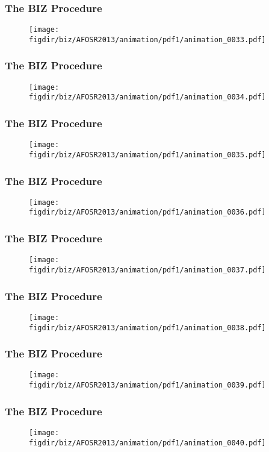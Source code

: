 \documentclass[13pt]{beamer}
\newcommand{\figdir}{../../fig}
\begin{document}
\begin{frame}\frametitle{The BIZ Procedure}\begin{figure}\texttt{[image: \\figdir/biz/AFOSR2013/animation/pdf1/animation\_0033.pdf]}\end{figure}\end{frame}
\begin{frame}\frametitle{The BIZ Procedure}\begin{figure}\texttt{[image: \\figdir/biz/AFOSR2013/animation/pdf1/animation\_0034.pdf]}\end{figure}\end{frame}
\begin{frame}\frametitle{The BIZ Procedure}\begin{figure}\texttt{[image: \\figdir/biz/AFOSR2013/animation/pdf1/animation\_0035.pdf]}\end{figure}\end{frame}
\begin{frame}\frametitle{The BIZ Procedure}\begin{figure}\texttt{[image: \\figdir/biz/AFOSR2013/animation/pdf1/animation\_0036.pdf]}\end{figure}\end{frame}
\begin{frame}\frametitle{The BIZ Procedure}\begin{figure}\texttt{[image: \\figdir/biz/AFOSR2013/animation/pdf1/animation\_0037.pdf]}\end{figure}\end{frame}
\begin{frame}\frametitle{The BIZ Procedure}\begin{figure}\texttt{[image: \\figdir/biz/AFOSR2013/animation/pdf1/animation\_0038.pdf]}\end{figure}\end{frame}
\begin{frame}\frametitle{The BIZ Procedure}\begin{figure}\texttt{[image: \\figdir/biz/AFOSR2013/animation/pdf1/animation\_0039.pdf]}\end{figure}\end{frame}
\begin{frame}\frametitle{The BIZ Procedure}\begin{figure}\texttt{[image: \\figdir/biz/AFOSR2013/animation/pdf1/animation\_0040.pdf]}\end{figure}\end{frame}
\end{document}
